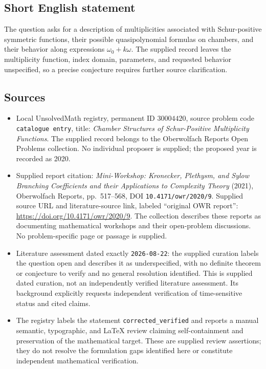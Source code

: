 \documentclass[11pt]{article}
\begin{document}
\subsection{Short English statement}
The question asks for a description of multiplicities associated with Schur-positive symmetric functions, their possible quasipolynomial formulas on chambers, and their behavior along expressions \(\omega_0+k\omega\). The supplied record leaves the multiplicity function, index domain, parameters, and requested behavior unspecified, so a precise conjecture requires further source clarification.
\subsection{Sources}
\begin{itemize}
\item Local UnsolvedMath registry, permanent ID \(30004420\), source problem code \texttt{catalogue entry}, title: \emph{Chamber Structures of Schur-Positive Multiplicity Functions}. The supplied record belongs to the Oberwolfach Reports Open Problems collection. No individual proposer is supplied; the proposed year is recorded as 2020.
\item Supplied report citation: \emph{Mini-Workshop: Kronecker, Plethysm, and Sylow Branching Coefficients and their Applications to Complexity Theory} (2021), Oberwolfach Reports, pp.\ 517--568, DOI \texttt{10.4171/owr/2020/9}. Supplied source URL and literature-source link, labeled ``original OWR report'': \url{https://doi.org/10.4171/owr/2020/9}. The collection describes these reports as documenting mathematical workshops and their open-problem discussions. No problem-specific page or passage is supplied.
\item Literature assessment dated exactly \texttt{2026-08-22}: the supplied curation labels the question open and describes it as underspecified, with no definite theorem or conjecture to verify and no general resolution identified. This is supplied dated curation, not an independently verified literature assessment. Its background explicitly requests independent verification of time-sensitive status and cited claims.
\item The registry labels the statement \texttt{corrected\_verified} and reports a manual semantic, typographic, and LaTeX review claiming self-containment and preservation of the mathematical target. These are supplied review assertions; they do not resolve the formulation gaps identified here or constitute independent mathematical verification.
\end{itemize}
\end{document}
